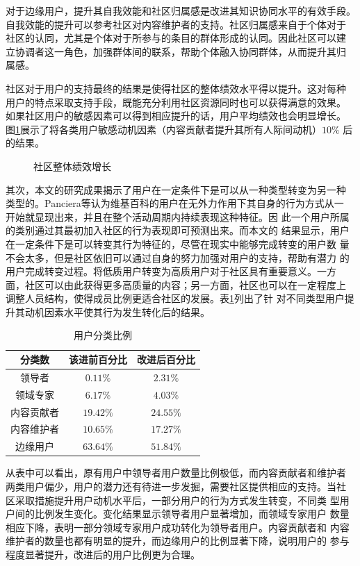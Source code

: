 对于边缘用户，提升其自我效能和社区归属感是改进其知识协同水平的有效手段。
自我效能的提升可以参考社区对内容维护者的支持。社区归属感来自于个体对于
社区的认同，尤其是个体对于所参与的条目的群体形成的认同。因此社区可以建
立协调者这一角色，加强群体间的联系，帮助个体融入协同群体，从而提升其归
属感。

社区对于用户的支持最终的结果是使得社区的整体绩效水平得以提升。这对每种
用户的特点采取支持手段，既能充分利用社区资源同时也可以获得满意的效果。
如果社区用户的敏感因素可以得到相应提升的话，用户平均绩效也会明显增长。
图\ref{fig:increase-total}展示了将各类用户敏感动机因素（内容贡献者提升其所有人际间动机）$10\%$
后的结果。

\begin{figure}[!htb]
  \centering
  
  \caption{社区整体绩效增长}
  \label{fig:increase-total}
\end{figure}

其次，本文的研究成果揭示了用户在一定条件下是可以从一种类型转变为另一种
类型的。Panciera等认为维基百科的用户在无外力作用下其自身的行为方式从一
开始就显现出来，并且在整个活动周期内持续表现这种特征\cite{1531682}。因
此一个用户所属的类别通过其最初加入社区的行为表现即可预测出来。而本文的
结果显示，用户在一定条件下是可以转变其行为特征的，尽管在现实中能够完成转变的用户数
量不会太多，但是社区依旧可以通过自身的努力加强对用户的支持，帮助有潜力
的用户完成转变过程。将低质用户转变为高质用户对于社区具有重要意义。一方
面，社区可以由此获得更多高质量的内容；另一方面，社区也可以在一定程度上
调整人员结构，使得成员比例更适合社区的发展。表\ref{tab:ratio}列出了针
对不同类型用户提升其动机因素水平使其行为发生转化后的结果。

\begin{table}[htb]
  \centering
 \small
 \caption{\small{用户分类比例}}
  \begin{tabular}{|c|c|c|}
\hline
    分类数&该进前百分比&改进后百分比\\\hline
    领导者&$0.11\%$&$2.31\%$\\\hline
    领域专家&$6.17\%$&$4.03\%$\\\hline
    内容贡献者&$19.42\%$&$24.55\%$\\\hline
    
   内容维护者&$10.65\%$&$17.27\%$\\\hline
    边缘用户&$63.64\%$&$51.84\%$\\\hline
  \end{tabular}
 
  \label{tab:ratio}
\end{table}
从表中可以看出，原有用户中领导者用户数量比例极低，而内容贡献者和维护者
两类用户偏少，用户的潜力还有待进一步发掘，需要社区提供相应的支持。当社
区采取措施提升用户动机水平后，一部分用户的行为方式发生转变，不同类
型用户间的比例发生变化。变化结果显示领导者用户显著增加，而领域专家用户
数量相应下降，表明一部分领域专家用户成功转化为领导者用户。内容贡献者和
内容维护者的数量也都有明显的提升，而边缘用户的比例显著下降，说明用户的
参与程度显著提升，改进后的用户比例更为合理。

